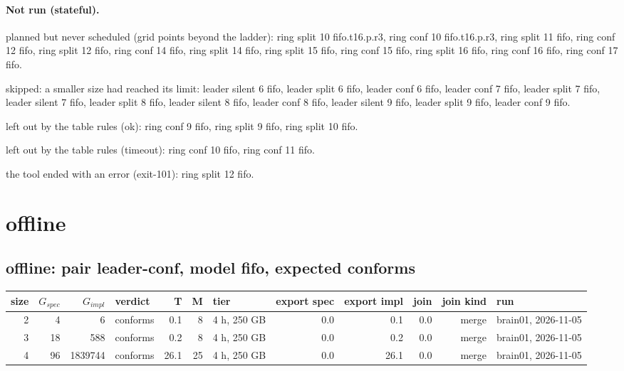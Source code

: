\documentclass[10pt]{article}
\begin{document}
\paragraph{Not run (stateful).}
planned but never scheduled (grid points beyond the ladder): ring split 10 fifo.t16.p.r3, ring conf 10 fifo.t16.p.r3, ring split 11 fifo, ring conf 12 fifo, ring split 12 fifo, ring conf 14 fifo, ring split 14 fifo, ring split 15 fifo, ring conf 15 fifo, ring split 16 fifo, ring conf 16 fifo, ring conf 17 fifo.\par
skipped: a smaller size had reached its limit: leader silent 6 fifo, leader split 6 fifo, leader conf 6 fifo, leader conf 7 fifo, leader split 7 fifo, leader silent 7 fifo, leader split 8 fifo, leader silent 8 fifo, leader conf 8 fifo, leader silent 9 fifo, leader split 9 fifo, leader conf 9 fifo.\par
left out by the table rules (ok): ring conf 9 fifo, ring split 9 fifo, ring split 10 fifo.\par
left out by the table rules (timeout): ring conf 10 fifo, ring conf 11 fifo.\par
the tool ended with an error (exit-101): ring split 12 fifo.\par
\section*{offline}
\subsection*{offline: pair \textsf{leader-conf}, model fifo, expected conforms}
\begin{longtable}{@{}rrrlrrlrrrrl@{}}
\toprule
size & $G_{\mathit{spec}}$ & $G_{\mathit{impl}}$ & verdict & T & M & tier & export spec & export impl & join & join kind & run \\
\midrule
\endhead
\color{blue} 2 & 4 & 6 & conforms & 0.1 & 8 & 4 h, 250 GB & 0.0 & 0.1 & 0.0 & merge & brain01, 2026-11-05 \\
\color{blue} 3 & 18 & 588 & conforms & 0.2 & 8 & 4 h, 250 GB & 0.0 & 0.2 & 0.0 & merge & brain01, 2026-11-05 \\
\color{blue} 4 & 96 & 1839744 & conforms & 26.1 & 25 & 4 h, 250 GB & 0.0 & 26.1 & 0.0 & merge & brain01, 2026-11-05 \\
\bottomrule
\end{longtable}
\end{document}
